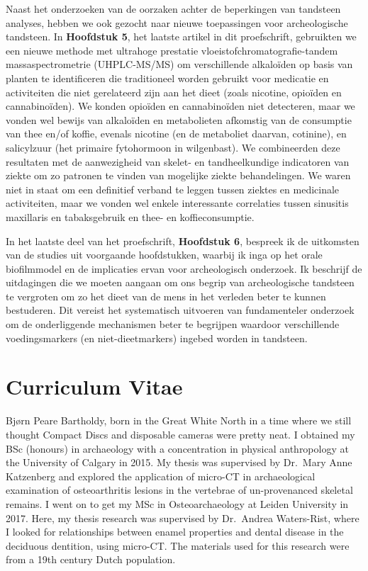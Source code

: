 \documentclass[
  b5paper,
]{book}
\begin{document}
Naast het onderzoeken van de oorzaken achter de beperkingen van
tandsteen analyses, hebben we ook gezocht naar nieuwe toepassingen voor
archeologische tandsteen. In \textbf{Hoofdstuk 5}, het laatste artikel
in dit proefschrift, gebruikten we een nieuwe methode met ultrahoge
prestatie vloeistofchromatografie-tandem massaspectrometrie
(UHPLC-MS/MS) om verschillende alkaloïden op basis van planten te
identificeren die traditioneel worden gebruikt voor medicatie en
activiteiten die niet gerelateerd zijn aan het dieet (zoals nicotine,
opioïden en cannabinoïden). We konden opioïden en cannabinoïden niet
detecteren, maar we vonden wel bewijs van alkaloïden en metabolieten
afkomstig van de consumptie van thee en/of koffie, evenals nicotine (en
de metaboliet daarvan, cotinine), en salicylzuur (het primaire
fytohormoon in wilgenbast). We combineerden deze resultaten met de
aanwezigheid van skelet- en tandheelkundige indicatoren van ziekte om zo
patronen te vinden van mogelijke ziekte behandelingen. We waren niet in
staat om een definitief verband te leggen tussen ziektes en medicinale
activiteiten, maar we vonden wel enkele interessante correlaties tussen
sinusitis maxillaris en tabaksgebruik en thee- en koffieconsumptie.

In het laatste deel van het proefschrift, \textbf{Hoofdstuk 6}, bespreek
ik de uitkomsten van de studies uit voorgaande hoofdstukken, waarbij ik
inga op het orale biofilmmodel en de implicaties ervan voor
archeologisch onderzoek. Ik beschrijf de uitdagingen die we moeten
aangaan om ons begrip van archeologische tandsteen te vergroten om zo
het dieet van de mens in het verleden beter te kunnen bestuderen. Dit
vereist het systematisch uitvoeren van fundamenteler onderzoek om de
onderliggende mechanismen beter te begrijpen waardoor verschillende
voedingsmarkers (en niet-dieetmarkers) ingebed worden in tandsteen.

\hypertarget{curriculum-vitae}{%
\chapter*{Curriculum Vitae}\label{curriculum-vitae}}


Bjørn Peare Bartholdy, born in the Great White North in a time where we
still thought Compact Discs and disposable cameras were pretty neat. I
obtained my BSc (honours) in archaeology with a concentration in
physical anthropology at the University of Calgary in 2015. My thesis
was supervised by Dr.~Mary Anne Katzenberg and explored the application
of micro-CT in archaeological examination of osteoarthritis lesions in
the vertebrae of un-provenanced skeletal remains. I went on to get my
MSc in Osteoarchaeology at Leiden University in 2017. Here, my thesis
research was supervised by Dr.~Andrea Waters-Rist, where I looked for
relationships between enamel properties and dental disease in the
deciduous dentition, using micro-CT. The materials used for this
research were from a 19th century Dutch population.
\end{document}
